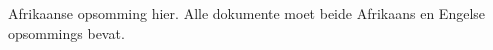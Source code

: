 
\begin{opsomming}        %

Afrikaanse opsomming hier. Alle dokumente moet beide Afrikaans en Engelse opsommings bevat.

\end{opsomming}
